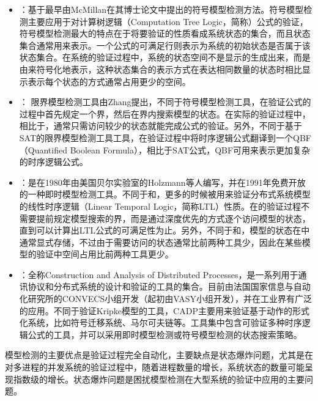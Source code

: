\begin{itemize}
	\item \nusmv{}：\nusmv{}基于最早由McMillan在其博士论文\cite{mcmillan93}中提出的符号模型检测方法。符号模型检测主要应用于对计算树逻辑（Computation Tree Logic，简称\CTL{}）公式的验证，符号模型检测最大的特点在于将要验证的性质看成系统状态的集合，而且状态集合通常用\BDD{}\cite{Bryant86}来表示。一个\CTL{}公式的可满足行则表示为系统的初始状态是否属于该状态集合。在系统的验证过程中，系统的状态空间不是显示的生成出来，而是由\BDD{}来符号化地表示，这种状态集合的表示方式在表达相同数量的状态时相比显示表示每个状态的方式通常占用更少的空间。
	\item \verds{}：
	限界模型检测工具\verds{}由Zhang提出，不同于符号模型检测工具，\verds{}在验证公式的过程中首先规定一个界，然后在界内搜索模型的状态。在实际的验证过程中，相比于\nusmv{}，\verds{}通常只需访问较少的状态就能完成公式的验证。另外，不同于基于\textsf{SAT}\cite{BCCZ99}的限界模型检测工具工具，\verds{}在验证过程中将时序逻辑公式翻译到一个\textsf{QBF}（Quantified Boolean Formula），相比于\textsf{SAT}公式，\textsf{QBF}可用来表示更加复杂的时序逻辑公式。
	\item {}：是在1980年由美国贝尔实验室的Holzmann等人编写，并在1991年免费开放的一种即时模型检测工具。不同于\nusmv{}和\verds{}，更多的时候被用来验证分布式系统模型的线性时序逻辑（Linear Temporal Logic，简称\textsf{LTL}）性质。在的验证过程不需要提前规定模型搜索的界，而是通过深度优先的方式逐个访问模型的状态，直到可以计算出\textsf{LTL}公式的可满足性为止。另外，不同于\nusmv{}和\verds{}，模型的状态在中通常显式存储，不过由于需要访问的状态通常比前两种工具少，因此在某些模型的验证中空间占用比前两种工具更少。
	\item {}：全称Construction and Analysis of Distributed Processes，是一系列用于通讯协议和分布式系统的设计和验证的工具的集合。目前由法国国家信息与自动化研究所的\textsf{CONVECS}小组开发（起初由\textsf{VASY}小组开发），并在工业界有广泛的应用。不同于验证Kripke模型的工具，\textsf{CADP}主要用来验证基于动作的形式化系统，比如符号迁移系统、马尔可夫链等。\CADP{}工具集中包含可验证多种时序逻辑公式的工具，并可以采用即时模型检测或符号模型检测的状态搜索策略。
\end{itemize}

模型检测的主要优点是验证过程完全自动化，主要缺点是状态爆炸问题，尤其是在对多进程的并发系统的验证过程中，随着进程数量的增长，系统状态的数量可能呈现指数级的增长。状态爆炸问题是困扰模型检测在大型系统的验证中应用的主要问题。

